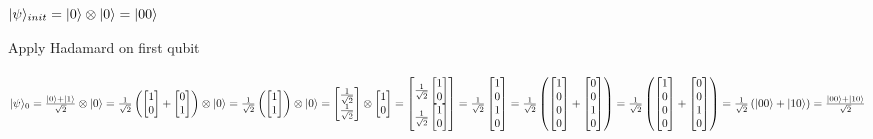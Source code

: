 \documentclass[11pt, fleqn]{article}
\begin{document}
\begin{Large}
$|\psi\rangle_{init} = |0\rangle \otimes |0\rangle = |00\rangle\\~\\$

Apply Hadamard on first qubit\\~\\
$|\psi\rangle_{0} = \frac{|0\rangle +|1\rangle}{\sqrt 2}\otimes |0\rangle=
\frac{1}{\sqrt 2}\left(\begin{bmatrix}1\\0 \end{bmatrix}+\begin{bmatrix}0\\1 \end{bmatrix}\right)\otimes |0\rangle=\\~\\
\frac{1}{\sqrt 2}\left(\begin{bmatrix}1\\1 \end{bmatrix}\right)\otimes|0\rangle=
\begin{bmatrix}\frac{1}{\sqrt 2}\\\frac{1}{\sqrt 2} \end{bmatrix}\otimes \begin{bmatrix}1\\0 \end{bmatrix}=
\begin{bmatrix}\frac{1}{\sqrt 2}\begin{bmatrix}1\\0 \end{bmatrix}\\\frac{1}{\sqrt 2}\begin{bmatrix}1\\0 \end{bmatrix}\end{bmatrix}=
\frac{1}{\sqrt 2}\begin{bmatrix}1\\0\\1\\0 \end{bmatrix}=
\frac{1}{\sqrt 2}\left(\begin{bmatrix}1\\0\\0\\0 \end{bmatrix}+
\begin{bmatrix}0\\0\\1\\0 \end{bmatrix}\right)=
\frac{1}{\sqrt 2}\left(\begin{bmatrix}1\\0\\0\\0 \end{bmatrix}+
\begin{bmatrix}0\\0\\1\\0 \end{bmatrix}\right)=
\frac{1}{\sqrt 2}\left(|00\rangle+|10\rangle\right)=
\frac{|00\rangle+|10\rangle}{\sqrt 2}\\~\\
$


\end{Large}
\end{document}
